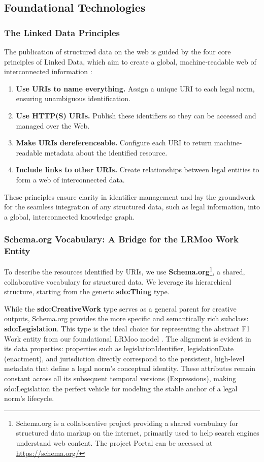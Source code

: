 \documentclass[11pt]{article}
\begin{document}
\subsection{Foundational Technologies}
\subsubsection{The Linked Data Principles}
The publication of structured data on the web is guided by the four core principles of Linked Data, which aim to create a global, machine-readable web of interconnected information \cite{bizer2008linkeddata}:
\begin{enumerate}
    \item \textbf{Use URIs to name everything.} Assign a unique URI to each legal norm, ensuring unambiguous identification.
    \item \textbf{Use HTTP(S) URIs.} Publish these identifiers so they can be accessed and managed over the Web.
    \item \textbf{Make URIs dereferenceable.} Configure each URI to return machine-readable metadata about the identified resource.
    \item \textbf{Include links to other URIs.} Create relationships between legal entities to form a web of interconnected data.
\end{enumerate}

These principles ensure clarity in identifier management and lay the groundwork for the seamless integration of any structured data, such as legal information, into a global, interconnected knowledge graph.

\subsubsection{Schema.org Vocabulary: A Bridge for the LRMoo Work Entity} 
To describe the resources identified by URIs, we use \textbf{Schema.org}\footnote{Schema.org is a collaborative project providing a shared vocabulary for structured data markup on the internet, primarily used to help search engines understand web content. The project Portal can be accessed at \url{https://schema.org/}}, a shared, collaborative vocabulary for structured data. We leverage its hierarchical structure, starting from the generic \textbf{sdo:Thing} type.

While the \textbf{sdo:CreativeWork} type serves as a general parent for creative outputs, Schema.org provides the more specific and semantically rich subclass: \textbf{sdo:Legislation}. This type is the ideal choice for representing the abstract F1 Work entity from our foundational LRMoo model \cite{demartim2025temporal}. The alignment is evident in its data properties: properties such as legislationIdentifier, legislationDate (enactment), and jurisdiction directly correspond to the persistent, high-level metadata that define a legal norm's conceptual identity. These attributes remain constant across all its subsequent temporal versions (Expressions), making sdo:Legislation the perfect vehicle for modeling the stable anchor of a legal norm's lifecycle.
\end{document}
